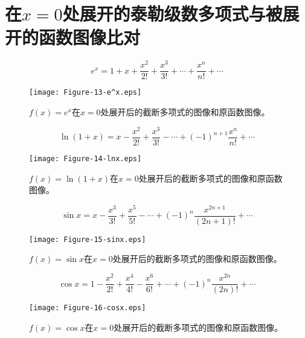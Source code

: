 
\chapter{在$x=0$处展开的泰勒级数多项式与被展开的函数图像比对}
\begin{thm}
    $$e^x=1+x+\dfrac{x^2}{2!}+\dfrac{x^3}{3!}+\cdots+\dfrac{x^n}{n!}+\cdots$$
\end{thm}
\begin{figure}[h]
	\texttt{[image: Figure-13-e^x.eps]}
	\caption[figex]{$f(x)=e^x$在$x=0$处展开后的截断多项式的图像和原函数图像。}
\end{figure}\par
\begin{thm}
    $$\ln(1+x)=x-\dfrac{x^2}{2!}+\dfrac{x^3}{3!}-\cdots+(-1)^{n+1}\dfrac{x^{n}}{n!}+\cdots$$
\end{thm}
\begin{figure}[h]
	\texttt{[image: Figure-14-lnx.eps]}
	\caption[figln]{$f(x)=\ln(1+x)$在$x=0$处展开后的截断多项式的图像和原函数图像。}
\end{figure}\par
\begin{thm}
    $$\sin x=x-\dfrac{x^3}{3!}+\dfrac{x^5}{5!}-\cdots+(-1)^{n}\dfrac{x^{2n+1}}{(2n+1)!}+\cdots$$
\end{thm}
\begin{figure}[h]
	\texttt{[image: Figure-15-sinx.eps]}
	\caption[figln]{$f(x)=\sin x$在$x=0$处展开后的截断多项式的图像和原函数图像。}
\end{figure}\par
\begin{thm}
    $$\cos x=1-\dfrac{x^2}{2!}+\dfrac{x^4}{4!}-\dfrac{x^6}{6!}+\cdots+(-1)^n\dfrac{x^{2n}}{(2n)!}+\cdots$$
\end{thm}
\begin{figure}[h]
	\texttt{[image: Figure-16-cosx.eps]}
	\caption[figln]{$f(x)=\cos x$在$x=0$处展开后的截断多项式的图像和原函数图像。}
\end{figure}